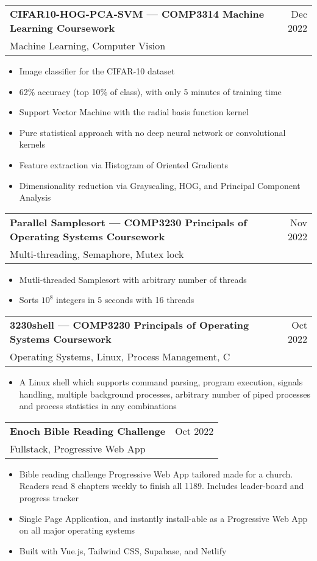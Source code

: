 \documentclass{article}
\makeatletter
\newcommand{\jobTitle}[3]{
    \vspace{0.3cm}
    \begin{tabular*}{1\textwidth}{||l@{\extracolsep{\fill}}r}
        \textbf{#1} & #2\\
        #3 &
    \end{tabular*}
}
\makeatother
\begin{document}
\jobTitle
{CIFAR10-HOG-PCA-SVM --- COMP3314 Machine Learning Coursework}
{Dec 2022}
{Machine Learning, Computer Vision}
\begin{itemize}
    \item Image classifier for the CIFAR-10 dataset
    \item 62\% accuracy (top 10\% of class), with only 5 minutes of training time
    \item Support Vector Machine with the radial basis function kernel
    \item Pure statistical approach with no deep neural network or convolutional kernels
    \item Feature extraction via Histogram of Oriented Gradients
    \item Dimensionality reduction via Grayscaling, HOG, and Principal Component Analysis
\end{itemize}

\jobTitle
{Parallel Samplesort --- COMP3230 Principals of Operating Systems Coursework}
{Nov 2022}
{Multi-threading, Semaphore, Mutex lock}
\begin{itemize}
    \item Mutli-threaded Samplesort with arbitrary number of threads
    \item Sorts $10^8$ integers in 5 seconds with 16 threads
\end{itemize}

\jobTitle
{3230shell --- COMP3230 Principals of Operating Systems Coursework}
{Oct 2022}
{Operating Systems, Linux, Process Management, C}
\begin{itemize}
    \item A Linux shell which supports command parsing, program execution, signals handling, multiple background processes, arbitrary number of piped processes and process statistics in any combinations
\end{itemize}

\jobTitle
{Enoch Bible Reading Challenge}
{Oct 2022}
{Fullstack, Progressive Web App}
\begin{itemize}
    \item Bible reading challenge Progressive Web App tailored made for a church. Readers read 8 chapters weekly to finish all 1189. Includes leader-board and progress tracker
	\item Single Page Application, and instantly install-able as a Progressive Web App on all major operating systems
    \item Built with Vue.js, Tailwind CSS, Supabase, and Netlify
\end{itemize}
\end{document}
